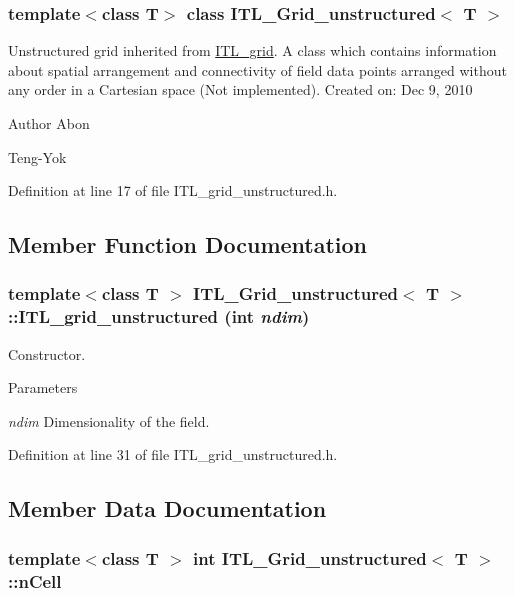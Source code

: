 \subsubsection*{template$<$class T$>$ class ITL\_\-Grid\_\-unstructured$<$ T $>$}

Unstructured grid inherited from \hyperlink{classITL__grid}{ITL\_\-grid}. A class which contains information about spatial arrangement and connectivity of field data points arranged without any order in a Cartesian space (Not implemented). Created on: Dec 9, 2010 \begin{DoxyAuthor}{Author}
Abon 

Teng-\/Yok 
\end{DoxyAuthor}


Definition at line 17 of file ITL\_\-grid\_\-unstructured.h.



\subsection{Member Function Documentation}
\hypertarget{classITL__Grid__unstructured_a05310e279796cc06c54ebe0035860889}{
\subsubsection[{ITL\_\-grid\_\-unstructured}]{\setlength{\rightskip}{0pt plus 5cm}template$<$class T $>$ {\bf ITL\_\-Grid\_\-unstructured}$<$ T $>$::ITL\_\-grid\_\-unstructured (int {\em ndim})}}
\label{classITL__Grid__unstructured_a05310e279796cc06c54ebe0035860889}


Constructor. 


\begin{DoxyParams}{Parameters}
\item[{\em ndim}]Dimensionality of the field. \end{DoxyParams}


Definition at line 31 of file ITL\_\-grid\_\-unstructured.h.



\subsection{Member Data Documentation}
\hypertarget{classITL__Grid__unstructured_a070240bebc3f566e00795b017be5b55b}{
\subsubsection[{nCell}]{\setlength{\rightskip}{0pt plus 5cm}template$<$class T $>$ int {\bf ITL\_\-Grid\_\-unstructured}$<$ T $>$::{\bf nCell}}}
\label{classITL__Grid__unstructured_a070240bebc3f566e00795b017be5b55b}


